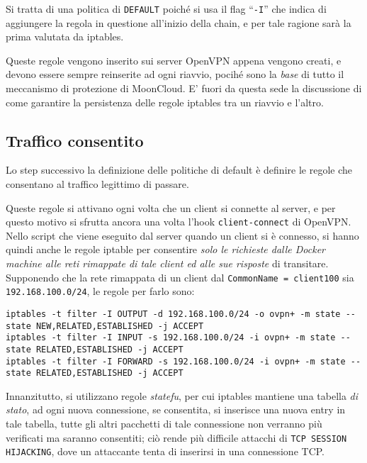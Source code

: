 		Si tratta di una politica di \texttt{DEFAULT} poiché si usa il flag ``\texttt{-I}''
		che indica di aggiungere la regola in questione all'inizio della chain, e per tale
		ragione sarà la prima valutata da iptables.
		
		
		Queste regole vengono inserito sui server OpenVPN appena vengono creati, e
		devono essere sempre reinserite ad ogni riavvio, pocihé sono la \textit{base}
		di tutto il meccanismo di protezione di MoonCloud. E' fuori da questa sede la discussione
		di come garantire la persistenza delle regole iptables tra un riavvio e l'altro.
		
		
		\subsection{Traffico consentito}
		Lo step successivo la definizione delle politiche di default è definire le regole che
		consentano al traffico legittimo di passare.
		
		Queste regole si attivano ogni volta che un client si connette al server, e per
		questo motivo si sfrutta ancora una volta l'hook \texttt{client-connect} di OpenVPN.
		Nello script che viene eseguito dal server quando un client si è connesso, si
		hanno quindi anche le regole iptable per consentire \textit{solo le richieste
		dalle Docker machine alle reti rimappate di tale client ed alle sue risposte}
		di transitare.
		Supponendo che la rete rimappata di un client dal \texttt{CommonName = client100} sia
		\texttt{192.168.100.0/24}, le regole per farlo sono:
\begin{verbatim}
iptables -t filter -I OUTPUT -d 192.168.100.0/24 -o ovpn+ -m state --state NEW,RELATED,ESTABLISHED -j ACCEPT
iptables -t filter -I INPUT -s 192.168.100.0/24 -i ovpn+ -m state --state RELATED,ESTABLISHED -j ACCEPT
iptables -t filter -I FORWARD -s 192.168.100.0/24 -i ovpn+ -m state --state RELATED,ESTABLISHED -j ACCEPT
\end{verbatim}
		
		Innanzitutto, si utilizzano regole \textit{statefu}, per cui iptables mantiene
		una tabella \textit{di stato}, ad ogni nuova connessione, se consentita, si inserisce
		una nuova entry in tale tabella, tutte gli altri pacchetti di tale connessione non
		verranno più verificati ma saranno consentiti; ciò rende più difficile
		attacchi di \texttt{TCP SESSION HIJACKING}, dove un attaccante tenta di inserirsi in
		una connessione TCP.
		
